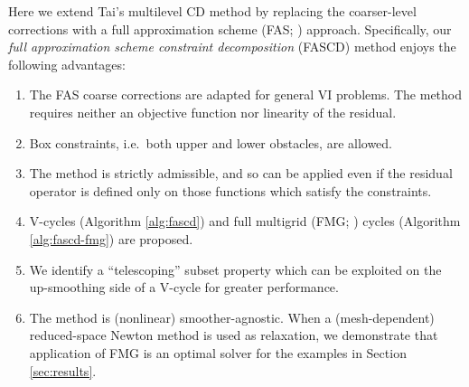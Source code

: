 \documentclass[review,hidelinks,onefignum,onetabnum]{siamart220329}
\begin{document}
Here we extend Tai's multilevel CD method by replacing the coarser-level corrections with a full approximation scheme (FAS; \cite{Brandt1977,Bruneetal2015}) approach.  Specifically, our \emph{full approximation scheme constraint decomposition} (FASCD) method enjoys the following advantages:
\renewcommand{\labelenumi}{\emph{(\roman{enumi})}}
\begin{enumerate}
\item The FAS coarse corrections are adapted for general VI problems. The method requires neither an objective function nor linearity of the residual.
\item Box constraints, i.e.~both upper and lower obstacles, are allowed.
\item The method is strictly admissible, and so can be applied even if the residual operator is defined only on those functions which satisfy the constraints.
\item V-cycles (Algorithm \ref{alg:fascd}) and full multigrid (FMG; \cite{Trottenbergetal2001}) cycles (Algorithm \ref{alg:fascd-fmg}) are proposed.
\item We identify a ``telescoping'' subset property which can be exploited on the up-smoothing side of a V-cycle for greater performance.
\item The method is (nonlinear) smoother-agnostic.  When a (mesh-dependent) reduced-space Newton method \cite{BensonMunson2006} is used as relaxation, we demonstrate that application of FMG is an optimal solver for the examples in Section \ref{sec:results}.
\end{enumerate}
\end{document}
